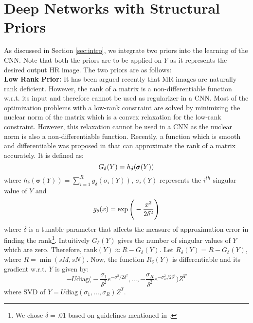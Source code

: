 \documentclass{article}
\def\sqz{\vspace{-3pt}}
\begin{document}
\section{Deep Networks with Structural Priors}
\sqz\sqz
As discussed in Section \ref{sec:intro}, we integrate two priors into the learning of the CNN. Note that both the priors are to be applied on $Y$ as it represents the desired output HR image. The two priors are as follows: \\
\textbf{Low Rank Prior:} It has been argued recently \cite{shi2015lrtv} that MR images are naturally rank deficient. However, the rank of a matrix is a non-differentiable function w.r.t. its input and therefore cannot be used as regularizer in a CNN. Most of the optimization problems with a low-rank constraint are solved by minimizing the nuclear norm of the matrix which is a convex relaxation for the low-rank constraint. However, this relaxation cannot be used in a CNN as the nuclear norm is also a non-differentiable function. Recently, a function which is smooth and differentiable was proposed in \cite{malek2014recovery} that can approximate the rank of a matrix accurately. It is defined as:\sqz\sqz
\begin{equation}\label{eq2}
G_{\delta}(Y) = h_{\delta}(\pmb{\sigma}(Y))\sqz\sqz
\end{equation}
where $h_{\delta}(\pmb{\sigma}(Y)) = \sum_{i=1}^{R}g_{\delta}(\sigma_{i}(Y))$, $\sigma_{i}(Y)$ represents the $i^{th}$ singular value of $Y$ and\sqz\sqz\sqz\sqz
\begin{equation}\label{eq3}
g_{\delta}(x) = \exp\Bigg(-\frac{x^{2}}{2\delta^{2}}\Bigg)\sqz\sqz
\end{equation}
where $\delta$ is a tunable parameter that affects the measure of approximation error in finding the rank\footnote{We chose $\delta = .01$ based on guidelines mentioned in \cite{malek2014recovery}.}. Intuitively $G_{\delta}(Y)$ gives the number of singular values of $Y$ which are zero. Therefore, $\mbox{rank}(Y)\approx R - G_{\delta}(Y)$. Let $R_{\delta}(Y) = R - G_{\delta}(Y)$, where $R = \min(sM, sN)$. Now, the function $R_{\delta}(Y)$ is differentiable and its gradient w.r.t. $Y$ is given by:
\begin{equation}\label{eq4}
-U\mbox{diag}\Bigg(-\frac{\sigma_{1}}{\delta^{2}}e^{-\sigma_{1}^{2}/2\delta^{2}},\ldots,-\frac{\sigma_{R}}{\delta^{2}}e^{-\sigma_{R}^{2}/2\delta^{2}}\Bigg)Z^{T}
\end{equation}
where SVD of $Y = U\mbox{diag}(\sigma_{1}, \ldots, \sigma_{R})Z^{T}$. \\ %
\end{document}
